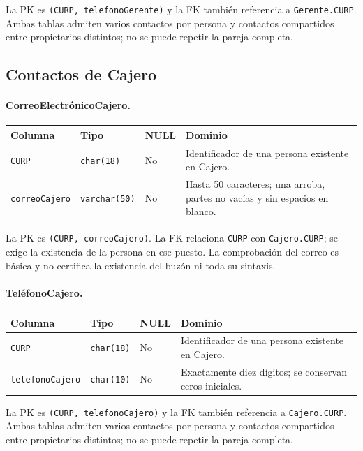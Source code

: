 La PK es \texttt{(CURP, telefonoGerente)} y la FK también referencia
a \texttt{Gerente.CURP}. Ambas tablas admiten varios contactos por
persona y contactos compartidos entre propietarios distintos; no se
puede repetir la pareja completa.

\subsection{Contactos de Cajero}

\paragraph{CorreoElectrónicoCajero.}
\noindent\begin{tabular}{@{}p{}p{}p{}p{}@{}}
\hline
\textbf{Columna} & \textbf{Tipo} & \textbf{NULL} & \textbf{Dominio} \\
\hline
\texttt{CURP} & \texttt{char(18)} & No & Identificador de una persona existente en Cajero. \\
\texttt{correoCajero} & \texttt{varchar(50)} & No & Hasta 50 caracteres; una arroba, partes no vacías y sin espacios en blanco. \\
\hline
\end{tabular}

La PK es \texttt{(CURP, correoCajero)}. La FK relaciona
\texttt{CURP} con \texttt{Cajero.CURP}; se exige la existencia de
la persona en ese puesto. La comprobación del correo es básica y no
certifica la existencia del buzón ni toda su sintaxis.

\paragraph{TeléfonoCajero.}
\noindent\begin{tabular}{@{}p{}p{}p{}p{}@{}}
\hline
\textbf{Columna} & \textbf{Tipo} & \textbf{NULL} & \textbf{Dominio} \\
\hline
\texttt{CURP} & \texttt{char(18)} & No & Identificador de una persona existente en Cajero. \\
\texttt{telefonoCajero} & \texttt{char(10)} & No & Exactamente diez dígitos; se conservan ceros iniciales. \\
\hline
\end{tabular}

La PK es \texttt{(CURP, telefonoCajero)} y la FK también referencia
a \texttt{Cajero.CURP}. Ambas tablas admiten varios contactos por
persona y contactos compartidos entre propietarios distintos; no se
puede repetir la pareja completa.

